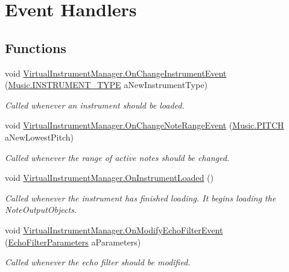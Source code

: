 \hypertarget{group___v_i_m_handlers}{}\section{Event Handlers}
\label{group___v_i_m_handlers}
\subsection*{Functions}
\begin{DoxyCompactItemize}
\item 
void \hyperlink{group___v_i_m_handlers_ga8e79286073756c31e08fecd59ce04fa7}{Virtual\+Instrument\+Manager.\+On\+Change\+Instrument\+Event} (\hyperlink{group___music_enums_gabfce60192305965558a36e368ebd67c3}{Music.\+I\+N\+S\+T\+R\+U\+M\+E\+N\+T\+\_\+\+T\+Y\+PE} a\+New\+Instrument\+Type)
\begin{DoxyCompactList}\small\item\em Called whenever an instrument should be loaded. \end{DoxyCompactList}\item 
void \hyperlink{group___v_i_m_handlers_ga660c766dceebfc830de2cf96686692df}{Virtual\+Instrument\+Manager.\+On\+Change\+Note\+Range\+Event} (\hyperlink{group___music_enums_ga508f69b199ea518f935486c990edac1d}{Music.\+P\+I\+T\+CH} a\+New\+Lowest\+Pitch)
\begin{DoxyCompactList}\small\item\em Called whenever the range of active notes should be changed. \end{DoxyCompactList}\item 
void \hyperlink{group___v_i_m_handlers_gac7d5b65484e450a400e32ab416ebc9f6}{Virtual\+Instrument\+Manager.\+On\+Instrument\+Loaded} ()
\begin{DoxyCompactList}\small\item\em Called whenever the instrument has finished loading. It begins loading the Note\+Output\+Objects. \end{DoxyCompactList}\item 
void \hyperlink{group___v_i_m_handlers_gae504c6ded8eb68ffb117c207fc25d99d}{Virtual\+Instrument\+Manager.\+On\+Modify\+Echo\+Filter\+Event} (\hyperlink{group__filter_params_struct_virtual_instrument_manager_1_1_echo_filter_parameters}{Echo\+Filter\+Parameters} a\+Parameters)
\begin{DoxyCompactList}\small\item\em Called whenever the echo filter should be modified. \end{DoxyCompactList}\item 

\end{DoxyCompactItemize}

